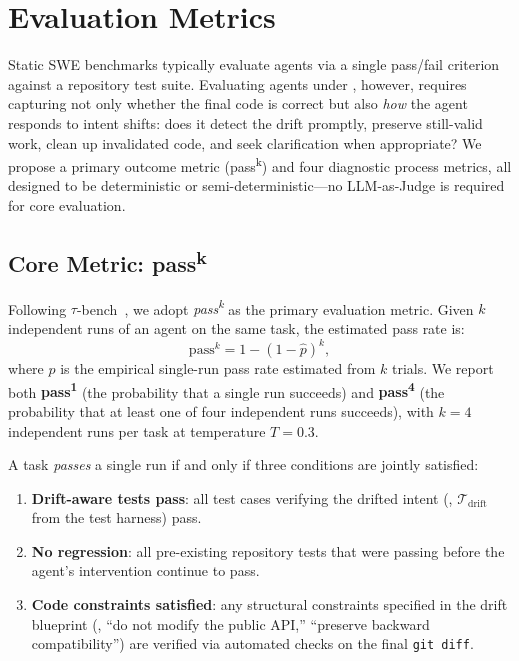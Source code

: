 \section{Evaluation Metrics}
\label{sec:metrics}

Static SWE benchmarks typically evaluate agents via a single pass/fail criterion against a repository test suite. Evaluating agents under \drift{}, however, requires capturing not only whether the final code is correct but also \emph{how} the agent responds to intent shifts: does it detect the drift promptly, preserve still-valid work, clean up invalidated code, and seek clarification when appropriate? We propose a primary outcome metric (pass\textsuperscript{k}) and four diagnostic process metrics, all designed to be deterministic or semi-deterministic---no LLM-as-Judge is required for core evaluation.

\subsection{Core Metric: pass\textsuperscript{k}}
\label{sec:passk}

Following $\tau$-bench~\citep{yao2024taubench}, we adopt \emph{pass\textsuperscript{k}} as the primary evaluation metric. Given $k$ independent runs of an agent on the same task, the estimated pass rate is:
\begin{equation}
\label{eq:passk}
\text{pass}^k = 1 - (1 - \hat{p})^k,
\end{equation}
where $\hat{p}$ is the empirical single-run pass rate estimated from $k$ trials. We report both \textbf{pass\textsuperscript{1}} (the probability that a single run succeeds) and \textbf{pass\textsuperscript{4}} (the probability that at least one of four independent runs succeeds), with $k = 4$ independent runs per task at temperature $T = 0.3$.

A task \emph{passes} a single run if and only if three conditions are jointly satisfied:
\begin{enumerate}[leftmargin=1.5em, itemsep=1pt]
    \item \textbf{Drift-aware tests pass}: all test cases verifying the drifted intent (\ie, $\mathcal{T}_{\text{drift}}$ from the test harness) pass.
    \item \textbf{No regression}: all pre-existing repository tests that were passing before the agent's intervention continue to pass.
    \item \textbf{Code constraints satisfied}: any structural constraints specified in the drift blueprint (\eg, ``do not modify the public API,'' ``preserve backward compatibility'') are verified via automated checks on the final \texttt{git diff}.
\end{enumerate}

